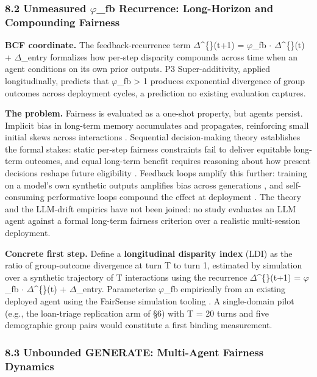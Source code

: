 \documentclass[10pt]{article}
\begin{document}
\subsubsection*{8.2 Unmeasured $\varphi$\_fb Recurrence: Long-Horizon and Compounding Fairness}

\textbf{BCF coordinate.} The feedback-recurrence term $\Delta$\textasciicircum\{\}(t+1) = $\varphi$\_fb $\cdot$ $\Delta$\textasciicircum\{\}(t) + $\Delta$\_entry formalizes how per-step disparity compounds across time when an agent conditions on its own prior outputs. P3 Super-additivity, applied longitudinally, predicts that $\varphi$\_fb > 1 produces exponential divergence of group outcomes across deployment cycles, a prediction no existing evaluation captures.

\textbf{The problem.} Fairness is evaluated as a one-shot property, but agents persist. Implicit bias in long-term memory accumulates and propagates, reinforcing small initial skews across interactions \cite{ma2026implicit}. Sequential decision-making theory establishes the formal stakes: static per-step fairness constraints fail to deliver equitable long-term outcomes, and equal long-term benefit requires reasoning about how present decisions reshape future eligibility \cite{hu2022achieving,xu2024adapting}. Feedback loops amplify this further: training on a model's own synthetic outputs amplifies bias across generations \cite{wyllie2024fairness}, and self-consuming performative loops compound the effect at deployment \cite{wang2026observations}. The theory and the LLM-drift empirics \cite{fan2024fairmt,ma2026implicit,liu2025truth} have not been joined: no study evaluates an LLM agent against a formal long-term fairness criterion over a realistic multi-session deployment.

\textbf{Concrete first step.} Define a \textbf{longitudinal disparity index} (LDI) as the ratio of group-outcome divergence at turn T to turn 1, estimated by simulation over a synthetic trajectory of T interactions using the recurrence $\Delta$\textasciicircum\{\}(t+1) = $\varphi$\_fb $\cdot$ $\Delta$\textasciicircum\{\}(t) + $\Delta$\_entry. Parameterize $\varphi$\_fb empirically from an existing deployed agent using the FairSense simulation tooling \cite{she2025fairsense}. A single-domain pilot (e.g., the loan-triage replication arm of \S{}6) with T = 20 turns and five demographic group pairs would constitute a first binding measurement.

\subsubsection*{8.3 Unbounded GENERATE: Multi-Agent Fairness Dynamics}
\end{document}
